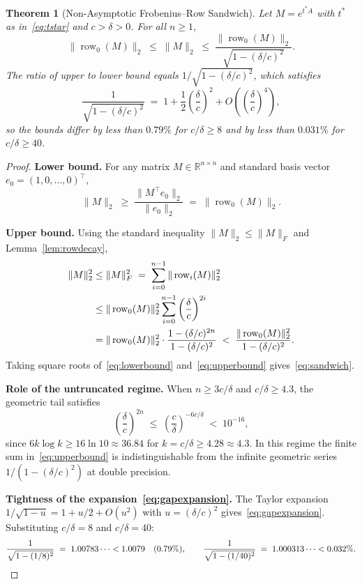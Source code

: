 \documentclass[11pt,reqno]{article}
\theoremstyle{plain}
\newtheorem{theorem}{Theorem}[section]
\theoremstyle{definition}
\theoremstyle{remark}
\numberwithin{equation}{section}
\begin{document}
\begin{theorem}[Non-Asymptotic Frobenius--Row Sandwich]\label{thm:sandwich}
Let $M = e^{t^*A}$ with $t^*$ as in~\eqref{eq:tstar} and $c > \delta > 0$. For all $n \ge 1$,
\begin{equation}\label{eq:sandwich}
  \|\operatorname{row}_0(M)\|_2 \;\le\; \|M\|_2 \;\le\; \frac{\|\operatorname{row}_0(M)\|_2}{\sqrt{1 - (\delta/c)^2}}.
\end{equation}
The ratio of upper to lower bound equals $1/\sqrt{1 - (\delta/c)^2}$, which satisfies
\begin{equation}\label{eq:gapexpansion}
  \frac{1}{\sqrt{1 - (\delta/c)^2}} \;=\; 1 + \frac{1}{2}\left(\frac{\delta}{c}\right)^2 + O\left(\left(\frac{\delta}{c}\right)^4\right),
\end{equation}
so the bounds differ by less than $0.79\%$ for $c/\delta \ge 8$ and by less than $0.031\%$ for $c/\delta \ge 40$.
\end{theorem}

\begin{proof}
\textbf{Lower bound.} For any matrix $M \in \mathbb{R}^{n\times n}$ and standard basis vector $e_0 = (1, 0, \dots, 0)^\top$,
\begin{equation}\label{eq:lowerbound}
  \|M\|_2 \;\ge\; \frac{\|M^\top e_0\|_2}{\|e_0\|_2} \;=\; \|\operatorname{row}_0(M)\|_2.
\end{equation}

\textbf{Upper bound.} Using the standard inequality $\|M\|_2 \le \|M\|_F$ and Lemma~\ref{lem:rowdecay},
\begin{align}
  \|M\|_2^2 &\le \|M\|_F^2 \;=\; \sum_{i=0}^{n-1} \|\operatorname{row}_i(M)\|_2^2 \notag\\
  &\le \|\operatorname{row}_0(M)\|_2^2 \sum_{i=0}^{n-1} \left(\frac{\delta}{c}\right)^{2i} \notag\\
  &= \|\operatorname{row}_0(M)\|_2^2 \cdot \frac{1 - (\delta/c)^{2n}}{1 - (\delta/c)^2} \;<\; \frac{\|\operatorname{row}_0(M)\|_2^2}{1 - (\delta/c)^2}. \label{eq:upperbound}
\end{align}
Taking square roots of~\eqref{eq:lowerbound} and~\eqref{eq:upperbound} gives~\eqref{eq:sandwich}.

\textbf{Role of the untruncated regime.} When $n \ge 3c/\delta$ and $c/\delta \ge 4.3$, the geometric tail satisfies
\begin{equation}\label{eq:tailbound_correct}
  \left(\frac{\delta}{c}\right)^{2n} \;\le\; \left(\frac{c}{\delta}\right)^{-6c/\delta} \;<\; 10^{-16},
\end{equation}
since $6k\log k \ge 16\ln 10 \approx 36.84$ for $k = c/\delta \ge 4.28 \approx 4.3$. In this regime the finite sum in~\eqref{eq:upperbound} is indistinguishable from the infinite geometric series $1/(1 - (\delta/c)^2)$ at double precision.

\textbf{Tightness of the expansion~\eqref{eq:gapexpansion}.} The Taylor expansion $1/\sqrt{1-u} = 1 + u/2 + O(u^2)$ with $u = (\delta/c)^2$ gives~\eqref{eq:gapexpansion}. Substituting $c/\delta = 8$ and $c/\delta = 40$:
\[
  \frac{1}{\sqrt{1 - (1/8)^2}} \;=\; 1.00783\dots < 1.0079 \quad (0.79\%), \qquad \frac{1}{\sqrt{1 - (1/40)^2}} \;=\; 1.000313\dots < 0.032\%. \qedhere
\]
\end{proof}
\end{document}
